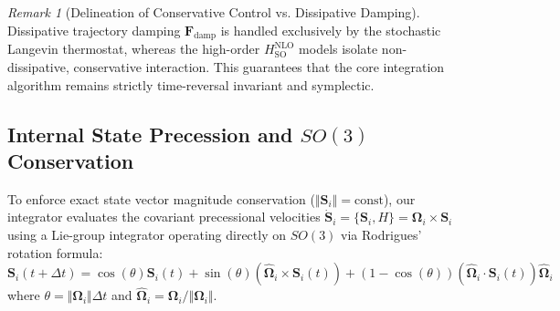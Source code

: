 \documentclass[11pt,a4paper,reqno]{article}
\theoremstyle{plain}
\theoremstyle{definition}
\theoremstyle{remark}
\newtheorem{remark}[theorem]{Remark}
\numberwithin{equation}{section}
\begin{document}
\begin{remark}[Delineation of Conservative Control vs. Dissipative Damping]
Dissipative trajectory damping $\mathbf{F}_{\mathrm{damp}}$ is handled exclusively by the stochastic Langevin thermostat, whereas the high-order $H_{\mathrm{SO}}^{\mathrm{NLO}}$ models isolate non-dissipative, conservative interaction. This guarantees that the core integration algorithm remains strictly time-reversal invariant and symplectic.
\end{remark}

\subsection{Internal State Precession and \texorpdfstring{$SO(3)$}{SO(3)} Conservation}
\label{subsec:spin_precession}
To enforce exact state vector magnitude conservation ($\Vert\bm{S}_i\Vert = \text{const}$), our integrator evaluates the covariant precessional velocities $\dot{\bm{S}}_i = \{ \bm{S}_i, H \} = \bm{\Omega}_i \times \bm{S}_i$ using a Lie-group integrator operating directly on $SO(3)$ via Rodrigues' rotation formula:
\begin{equation}
\bm{S}_i(t + \Delta t) = \cos(\theta) \bm{S}_i(t) + \sin(\theta) (\hat{\bm{\Omega}}_i \times \bm{S}_i(t)) + (1 - \cos(\theta)) (\hat{\bm{\Omega}}_i \cdot \bm{S}_i(t)) \hat{\bm{\Omega}}_i
\end{equation}
where $\theta = \Vert\bm{\Omega}_i\Vert \Delta t$ and $\hat{\bm{\Omega}}_i = \bm{\Omega}_i / \Vert\bm{\Omega}_i\Vert$. 
\end{document}
